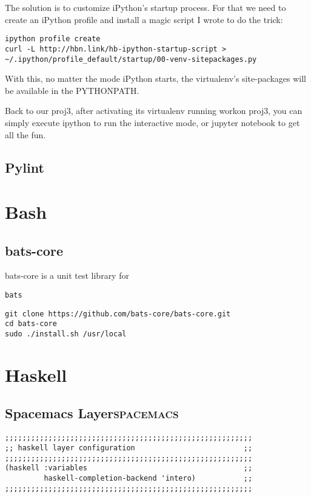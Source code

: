 \documentclass[11pt]{article}
\begin{document}
The solution is to customize iPython's startup process. For that we need to create an iPython profile and install a magic script I wrote to do the trick:

\begin{verbatim}
ipython profile create
curl -L http://hbn.link/hb-ipython-startup-script > ~/.ipython/profile_default/startup/00-venv-sitepackages.py
\end{verbatim}
With this, no matter the mode iPython starts, the virtualenv's site-packages will be available in the PYTHONPATH.

Back to our proj3, after activating its virtualenv running workon proj3, you can simply execute ipython to run the interactive mode, or jupyter notebook to get all the fun.

\subsection{Pylint}
\label{sec:orga7160ad}

\section{Bash}
\label{sec:org93de435}

\subsection{bats-core}
\label{sec:org16c8e9c}
bats-core is a unit test library for 

\begin{verbatim}
bats
\end{verbatim}

\begin{verbatim}
git clone https://github.com/bats-core/bats-core.git
cd bats-core
sudo ./install.sh /usr/local
\end{verbatim}

\section{Haskell}
\label{sec:org2281885}
\subsection{Spacemacs Layer\hfill{}\textsc{spacemacs}}
\label{sec:org0abef70}
\begin{verbatim}
;;;;;;;;;;;;;;;;;;;;;;;;;;;;;;;;;;;;;;;;;;;;;;;;;;;;;;;;;
;; haskell layer configuration                         ;;
;;;;;;;;;;;;;;;;;;;;;;;;;;;;;;;;;;;;;;;;;;;;;;;;;;;;;;;;;
(haskell :variables                                    ;;
         haskell-completion-backend 'intero)           ;;
;;;;;;;;;;;;;;;;;;;;;;;;;;;;;;;;;;;;;;;;;;;;;;;;;;;;;;;;;
\end{verbatim}
\end{document}
